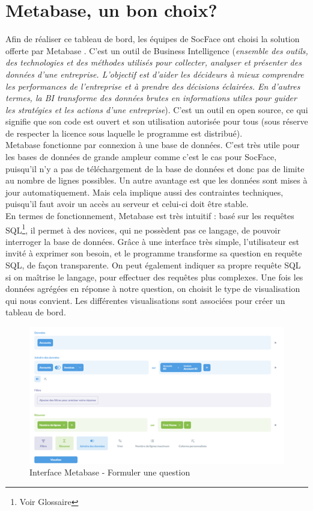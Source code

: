 \section{Metabase, un bon choix?}
Afin de réaliser ce tableau de bord, les équipes de SocFace ont choisi la solution offerte par Metabase . C’est un outil de Business Intelligence (\textit{ensemble des outils, des technologies et des méthodes utilisés pour collecter, analyser et présenter des données d'une entreprise. L'objectif est d'aider les décideurs à mieux comprendre les performances de l'entreprise et à prendre des décisions éclairées. En d'autres termes, la BI transforme des données brutes en informations utiles pour guider les stratégies et les actions d'une entreprise}). C’est un outil en open source, ce qui signifie que son code est ouvert et son utilisation autorisée pour tous (sous réserve de respecter la licence sous laquelle le programme est distribué).\\
Metabase fonctionne par connexion à une base de données. C’est très utile pour les bases de données de grande ampleur comme c’est le cas pour SocFace, puisqu’il n’y a pas de téléchargement de la base de données et donc pas de limite au nombre de lignes possibles. Un autre avantage est que les données sont mises à jour automatiquement. Mais cela implique aussi des contraintes techniques, puisqu’il faut avoir un accès au serveur et celui-ci doit être stable.\\
En termes de fonctionnement, Metabase est très intuitif : basé sur les requêtes SQL\footnote{Voir Glossaire}, il permet à des novices, qui ne possèdent pas ce langage, de pouvoir interroger la base de données. Grâce à une interface très simple, l’utilisateur est invité à exprimer son besoin, et le programme transforme sa question en requête SQL, de façon transparente. On peut également indiquer sa propre requête SQL si on maîtrise le langage, pour effectuer des requêtes plus complexes. Une fois les données agrégées en réponse à notre question, on choisit le type de visualisation qui nous convient. Les différentes visualisations sont associées pour créer un tableau de bord. 

\begin{figure}[H]
        \centering
        \includegraphics[width=1.0\linewidth]{Figures/Partie 2/Fig.2.2 - Metabase.png}
        \caption[Interface Metabase - Formuler une question]{Interface Metabase - Formuler une question}
        \label{fig:Fig2.2}
    \end{figure}

